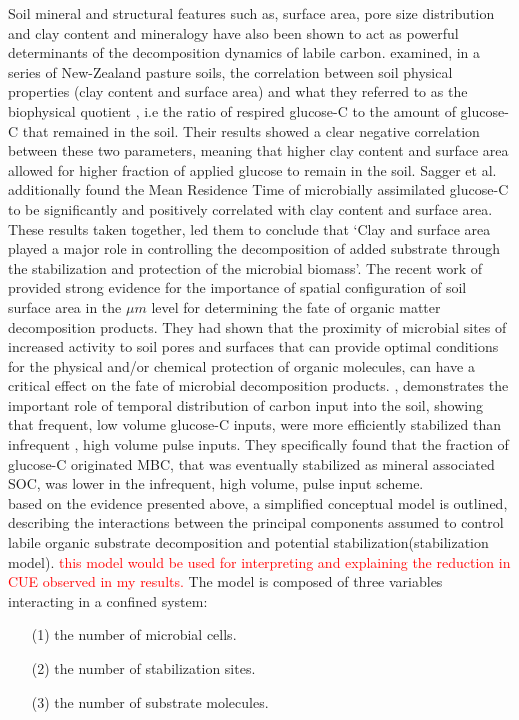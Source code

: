 \documentclass[12pt]{report}
\newcommand{\myRed}[1]{\textcolor{red}{#1}} %
\begin{document}
			Soil mineral and structural features such as, surface area, pore size distribution and clay content and mineralogy have also been shown to act as powerful determinants of the decomposition dynamics of labile carbon. \citet{saggar1999} examined, in a series of New-Zealand pasture soils, the correlation between soil physical properties (clay content and surface area) and what they referred to as the biophysical quotient , i.e the ratio of respired glucose-C to the amount of glucose-C that remained in the soil. Their results showed a clear negative correlation between these two parameters, meaning that higher clay content and surface area allowed for higher fraction of applied glucose to remain in the soil. Sagger et al. additionally found the Mean Residence Time of microbially assimilated glucose-C to be significantly and positively correlated with clay content and surface area. These results taken together, led them to conclude that ‘Clay and surface area played a major role in controlling the decomposition of added substrate through the stabilization and protection of the microbial biomass’\citep[p. 12]{saggar1999}. The recent work of \citet{kravchenko2019} provided strong evidence for the importance of spatial configuration of soil surface area in the $ \mu m $ level for determining the fate of organic matter decomposition products. They had shown that the proximity of microbial sites of increased activity to soil pores and surfaces that can provide optimal conditions for the physical and/or chemical protection of organic molecules, can have a critical effect on the fate of microbial decomposition products. 
			\citet{sokol2019c}, demonstrates the important role of temporal distribution of carbon input into the soil, showing that frequent, low volume glucose-C inputs, were more efficiently stabilized than infrequent , high volume pulse inputs. They specifically found that the fraction of glucose-C originated MBC, that was eventually stabilized as mineral associated SOC, was lower in the infrequent, high volume, pulse input scheme.\\
			based on the evidence presented above,  a simplified conceptual model is outlined, describing the interactions between the principal components assumed to control labile organic substrate decomposition and potential stabilization(stabilization model). \myRed{this model would be used for interpreting and explaining the reduction in CUE observed in my results.} The model is composed of three variables interacting in a confined system:
			\begin{enumerate}
				\item [(1)] the number of microbial cells.
				\item [(2)] the number of stabilization sites.
				\item [(3)]the number of substrate molecules.
			\end{enumerate}
		
\end{document}
